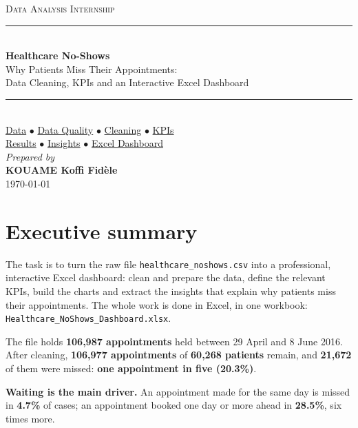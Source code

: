 \documentclass[12pt,a4paper]{article}
\newcommand{\F}[1]{{\small\texttt{#1}}}
\newcommand{\go}[2]{\hyperref[#1]{#2}}
\begin{document}
\begin{titlepage}\centering
\singlespacing
\vspace*{3cm}
{\large\scshape Data Analysis Internship}\\[2.6cm]
\rule{\linewidth}{0.5pt}\\[0.8cm]
{\LARGE\bfseries Healthcare No-Shows}\\[0.6cm]
{\large Why Patients Miss Their Appointments:\\[2pt] Data Cleaning, KPIs and an Interactive Excel Dashboard}\\[0.8cm]
\rule{\linewidth}{0.5pt}\\[1.2cm]
{\normalsize \go{sec:data}{Data} $\bullet$ \go{sec:quality}{Data Quality} $\bullet$
\go{sec:cleaning}{Cleaning} $\bullet$ \go{sec:kpis}{KPIs}\\[4pt]
\go{sec:results}{Results} $\bullet$ \go{sec:insights}{Insights} $\bullet$
\go{sec:dashboard}{Excel Dashboard}}\\[3.2cm]
{\large\itshape Prepared by}\\[0.5cm]
{\Large\bfseries KOUAME Koffi Fid\`ele}\\[0.6cm]
{\large \today}
\vfill\end{titlepage}

\singlespacing
\tableofcontents\newpage
\onehalfspacing

\section{Executive summary}\label{sec:summary}

The task is to turn the raw file \F{healthcare\_noshows.csv} into a professional,
interactive Excel dashboard: clean and prepare the data, define the relevant KPIs, build
the charts and extract the insights that explain why patients miss their appointments.
The whole work is done in Excel, in one workbook: \F{Healthcare\_NoShows\_Dashboard.xlsx}.

The file holds \textbf{106{,}987 appointments} held between 29 April and 8 June 2016.
After cleaning, \textbf{106{,}977 appointments} of \textbf{60{,}268 patients} remain, and
\textbf{21{,}672} of them were missed: \textbf{one appointment in five (20.3\%)}.

\textbf{Waiting is the main driver.} An appointment made for the same day is missed in
\textbf{4.7\%} of cases; an appointment booked one day or more ahead in \textbf{28.5\%},
six times more.
\end{document}

